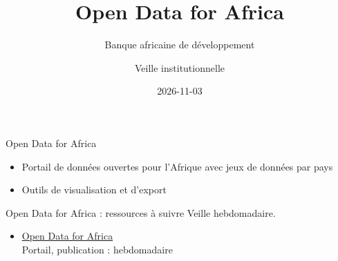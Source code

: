 \documentclass[aspectratio=169,11pt]{beamer}
\title{Open Data for Africa}
\subtitle{Banque africaine de développement}
\author{Veille institutionnelle}
\date{2026-11-03}
\begin{document}
\begin{frame}\titlepage\end{frame}

\begin{frame}{Open Data for Africa}
\begin{itemize}
\item Portail de données ouvertes pour l'Afrique avec jeux de données par pays
\item Outils de visualisation et d'export
\end{itemize}
\end{frame}

\begin{frame}{Open Data for Africa : ressources à suivre}
\small
Veille hebdomadaire.
\begin{itemize}
\item \href{https://dataportal.opendataforafrica.org}{Open Data for Africa}\\{\footnotesize Portail, publication : hebdomadaire}
\end{itemize}
\end{frame}
\end{document}
